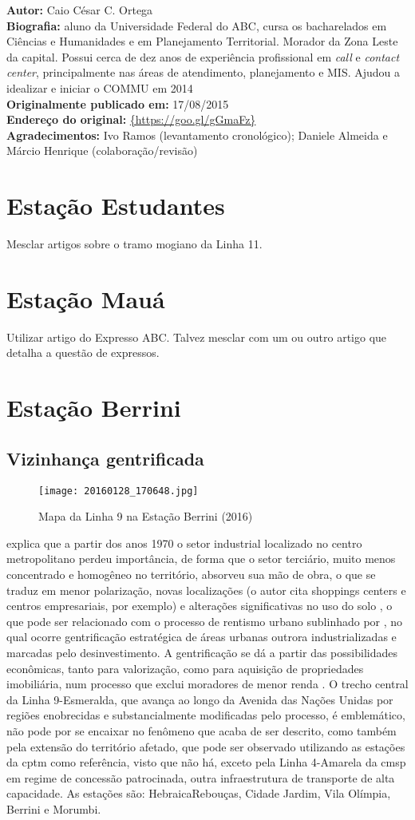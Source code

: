\documentclass[11pt,fleqn]{book} %
\newcommand{\infocaio}[2]{\textbf{Autor:} Caio C\'{e}sar C. Ortega \\ \textbf{Biografia:} aluno da Universidade Federal do ABC, cursa os bacharelados em Ci\^{e}ncias e Humanidades e em Planejamento Territorial. Morador da Zona Leste da capital. Possui cerca de dez anos de experi\^{e}ncia profissional em \textit{call} e \textit{contact center}, principalmente nas \'{a}reas de atendimento, planejamento e MIS. Ajudou a idealizar e iniciar o COMMU em 2014 \\ \textbf{Originalmente publicado em:} {#1} \\ \textbf{Endere\c{c}o do original:} \url{{#2}}}
\begin{document}
\begin{info}
	\infocaio{17/08/2015}{https://goo.gl/gGmaFz}\\
	\textbf{Agradecimentos:} Ivo Ramos (levantamento cronológico); Daniele Almeida e Márcio Henrique (colaboração/revisão)
\end{info}

\section{Estação Estudantes}

Mesclar artigos sobre o tramo mogiano da Linha 11.

\section{Estação Mauá}

Utilizar artigo do Expresso ABC. Talvez mesclar com um ou outro artigo que detalha a questão de expressos.

\section{Estação Berrini}\label{s:brr}

\subsection{Vizinhança gentrificada}

\begin{wrapfigure}{l}{0.25\textwidth}
	\caption{Mapa da Linha 9 na Estação Berrini (2016)}
	\texttt{[image: 20160128\_170648.jpg]}
\end{wrapfigure}

\cite[pág. 13]{Ferreira} explica que a partir dos anos 1970 o setor industrial localizado no centro metropolitano perdeu importância, de forma que o setor terciário, muito menos concentrado e homogêneo no território, absorveu sua mão de obra, o que se traduz em menor polarização, novas localizações (o autor cita shoppings centers e centros empresariais, por exemplo) e alterações significativas no uso do solo \cite[pág. 25]{Ferreira}, o que pode ser relacionado com o processo de rentismo urbano sublinhado por \cite[pág 30, nota de rodapé 2]{Acselrad}, no qual ocorre gentrificação estratégica de áreas urbanas outrora industrializadas e marcadas pelo desinvestimento. A gentrificação se dá a partir das possibilidades econômicas, tanto para valorização, como para aquisição de propriedades imobiliária, num processo que exclui moradores de menor renda \cite[pág. 28-29]{Acselrad}. O trecho central da Linha 9-Esmeralda, que avança ao longo da Avenida das Nações Unidas por regiões enobrecidas e substancialmente modificadas pelo processo, é emblemático, não pode por se encaixar no fenômeno que acaba de ser descrito, como também pela extensão do território afetado, que pode ser observado utilizando as estações da \gls{cptm} como referência, visto que não há, exceto pela Linha 4-Amarela da \gls{cmsp} em regime de concessão patrocinada, outra infraestrutura de transporte de alta capacidade. As estações são: Hebraica\textperiodcentered Rebouças, Cidade Jardim, Vila Olímpia, Berrini e Morumbi.
\end{document}
